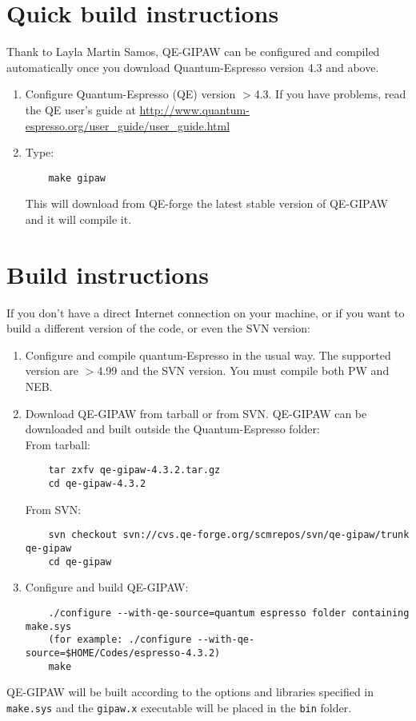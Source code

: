\documentclass[a4paper,11pt,twoside]{article}
\begin{document}
\section{Quick build instructions}
Thank to Layla Martin Samos, QE-GIPAW can be configured and compiled automatically
once you download Quantum-Espresso version 4.3 and above.
\begin{enumerate}
\item Configure Quantum-Espresso (QE) version $>$4.3. If you have problems, read the
QE user's guide at \url{http://www.quantum-espresso.org/user_guide/user_guide.html}
\item Type:
\begin{verbatim}
    make gipaw
\end{verbatim}
This will download from QE-forge the latest stable version of QE-GIPAW
and it will compile it.
\end{enumerate}

\section{Build instructions}
If you don't have a direct Internet connection on your machine, or if you want
to build a different version of the code, or even the SVN version:
\begin{enumerate}
\item Configure and compile quantum-Espresso in the usual way. The
supported version are $>$4.99 and the SVN version. You must compile
both PW and NEB.
\item Download QE-GIPAW from tarball or from SVN. QE-GIPAW can be
downloaded and built outside the Quantum-Espresso folder:\\
From tarball:
\begin{verbatim}
    tar zxfv qe-gipaw-4.3.2.tar.gz
    cd qe-gipaw-4.3.2
\end{verbatim}
From SVN:
\begin{verbatim}
    svn checkout svn://cvs.qe-forge.org/scmrepos/svn/qe-gipaw/trunk qe-gipaw
    cd qe-gipaw
\end{verbatim}
\item Configure and build QE-GIPAW:
\begin{verbatim}
    ./configure --with-qe-source=quantum espresso folder containing make.sys
    (for example: ./configure --with-qe-source=$HOME/Codes/espresso-4.3.2)
    make
\end{verbatim}
\end{enumerate}
QE-GIPAW will be built according to the options and libraries specified
in \texttt{make.sys} and the \texttt{gipaw.x} executable will be placed
in the \texttt{bin} folder.
\end{document}
